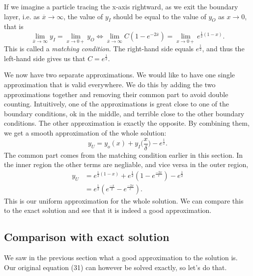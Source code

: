 \documentclass[12pt]{article}
\begin{document}
If we imagine a particle tracing the x-axis rightward, as we exit the boundary
layer, i.e. as $\overline{x} \to \infty$, the value of $y_I$ should be equal to
the value of $y_O$ as $x \to 0$, that is
\begin{equation}
\lim_{\overline{x} \to \infty} y_I = \lim_{x\to 0+} y_O \iff 
\lim_{\overline{x} \to \infty} C(1 - e^{-2\overline{x}}) = \lim_{x \to 0+} e^{\frac{1}{2}(1-x)}.
\end{equation}
This is called a \textit{matching condition}. The right-hand side equals
$e^{\frac{1}{2}}$, and thus the left-hand side gives us that $C =
e^{\frac{1}{2}}$.

We now have two separate approximations. We would like to have one
single approximation that is valid everywhere. We do this by adding
the two approximations together and removing their common part to
avoid double counting. Intuitively, one of the approximations is great
close to one of the boundary conditions, ok in the middle, and
terrible close to the other boundary conditions. The other
approximation is exactly the opposite. By combining them, we get a
smooth approximation of the whole solution:
\begin{equation}
y_U = y_o(x) + y_I\Big(\frac{x}{\delta}\Big) - e^{\frac{1}{2}}.
\end{equation}
The common part comes from the matching condition earlier in this
section. In the inner region the other terms are negliable, and vice
versa in the outer region,
\begin{align}
  y_U &= e^{\frac{1}{2}(1-x)} + e^{\frac{1}{2}}(1 - e^{\frac{-2x}{\epsilon}}) -
        e^{\frac{1}{2}} \\
      &=  e^{\frac{1}{2}}(e^{\frac{-x}{2}} - e^{\frac{-2x}{\epsilon}}).
\end{align}
This is our uniform approximation for the whole solution. We can
compare this to the exact solution and see that it is indeed a good
approximation.

\subsection{Comparison with exact solution}

We saw in the previous section what a good approximation to the
solution is. Our original equation (31) can however be solved exactly,
so let's do that.
\end{document}
